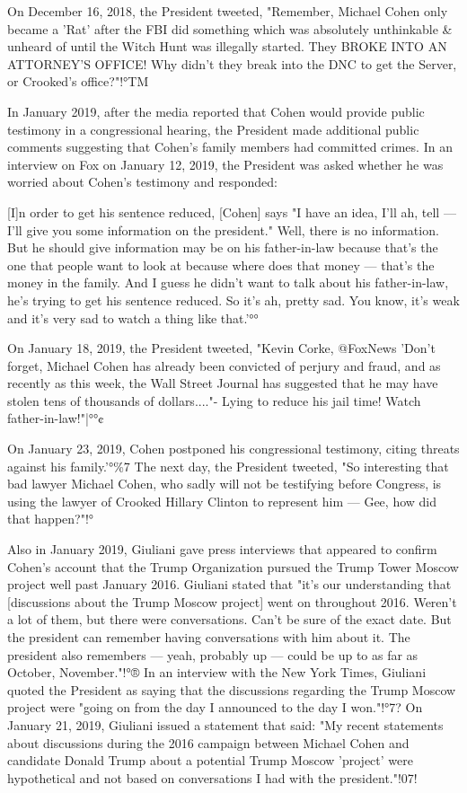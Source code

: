 On December 16, 2018, the President tweeted, "Remember, Michael Cohen only became a 'Rat' after the FBI did something which was absolutely unthinkable \& unheard of until the Witch Hunt was illegally started.
They BROKE INTO AN ATTORNEY'S OFFICE!
Why didn't they break into the DNC to get the Server, or Crooked's office?"!°TM

In January 2019, after the media reported that Cohen would provide public testimony in a congressional hearing, the President made additional public comments suggesting that Cohen's family members had committed crimes.
In an interview on Fox on January 12, 2019, the President was asked whether he was worried about Cohen's testimony and responded:

[I]n order to get his sentence reduced, [Cohen] says "I have an idea, I'll ah, tell — I'll give you some information on the president."
Well, there is no information.
But he should give information may be on his father-in-law because that's the one that people want to look at because where does that money — that's the money in the family.
And I guess he didn't want to talk about his father-in-law, he's trying to get his sentence reduced.
So it's ah, pretty sad.
You know, it's weak and it's very sad to watch a thing like that.'°°

On January 18, 2019, the President tweeted, "Kevin Corke, @FoxNews 'Don't forget, Michael Cohen has already been convicted of perjury and fraud, and as recently as this week, the Wall Street Journal has suggested that he may have stolen tens of thousands of dollars...."- Lying to reduce his jail time! Watch father-in-law!"|°°¢

On January 23, 2019, Cohen postponed his congressional testimony, citing threats against his family.'°\%7
The next day, the President tweeted, "So interesting that bad lawyer Michael Cohen, who sadly will not be testifying before Congress, is using the lawyer of Crooked Hillary Clinton to represent him — Gee, how did that happen?"!°%

Also in January 2019, Giuliani gave press interviews that appeared to confirm Cohen's account that the Trump Organization pursued the Trump Tower Moscow project well past January 2016.
Giuliani stated that "it's our understanding that [discussions about the Trump Moscow project] went on throughout 2016.
Weren't a lot of them, but there were conversations.
Can't be sure of the exact date.
But the president can remember having conversations with him about it.
The president also remembers — yeah, probably up — could be up to as far as October, November."!°®
In an interview with the New York Times, Giuliani quoted the President as saying that the discussions regarding the Trump Moscow project were "going on from the day I announced to the day I won."!°7?
On January 21, 2019, Giuliani issued a statement that said: "My recent statements about discussions during the 2016 campaign between Michael Cohen and candidate Donald Trump about a potential Trump Moscow 'project' were hypothetical and not based on conversations I had with the president."!07!

